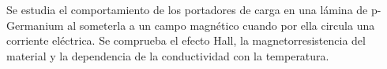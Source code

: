 Se estudia el comportamiento de los portadores de carga en una lámina de p-Germanium al someterla a un campo magnético cuando por ella circula una corriente eléctrica. Se comprueba el efecto Hall, la magnetorresistencia del material y la dependencia de la conductividad con la temperatura.